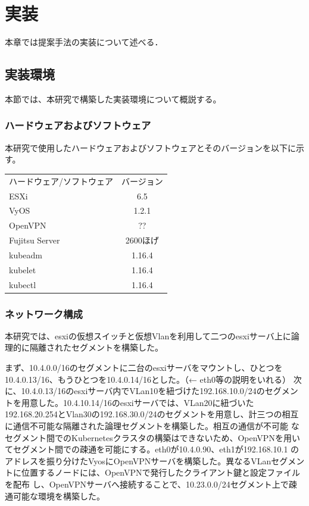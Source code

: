 \chapter{実装}
\label{implementation}

本章では提案手法の実装について述べる．

\section{実装環境}
\label{implementation:environment}
本節では、本研究で構築した実装環境について概説する。

\subsection{ハードウェアおよびソフトウェア}
\label{implementation:environment:resouces}
本研究で使用したハードウェアおよびソフトウェアとそのバージョンを以下に示す。

\begin{table}[htb]
  \begin{tabular}{lc}
    ハードウェア/ソフトウェア & バージョン \\
    ESXi & 6.5 \\
    VyOS & 1.2.1 \\
    OpenVPN & ?? \\
    Fujitsu Server & 2600ほげ \\
    kubeadm & 1.16.4 \\
    kubelet & 1.16.4 \\
    kubectl & 1.16.4 \\
  \end{tabular}
\end{table}

\subsection{ネットワーク構成}
\label{implementation:environment:network}
本研究では、esxiの仮想スイッチと仮想Vlanを利用して二つのesxiサーバ上に論理的に隔離されたセグメントを構築した。

まず、10.4.0.0/16のセグメントに二台のesxiサーバをマウントし、ひとつを10.4.0.13/16、もうひとつを10.4.0.14/16とした。（← eth0等の説明をいれる）
次に、10.4.0.13/16のesxiサーバ内でVLan10を紐づけた192.168.10.0/24のセグメントを用意した。10.4.10.14/16のesxiサーバでは、VLan20に紐づいた
192.168.20.254とVlan30の192.168.30.0/24のセグメントを用意し、計三つの相互に通信不可能な隔離された論理セグメントを構築した。相互の通信が不可能
なセグメント間でのKubernetesクラスタの構築はできないため、OpenVPNを用いてセグメント間での疎通を可能にする。eth0が10.4.0.90、eth1が192.168.10.1
のアドレスを振り分けたVyosにOpenVPNサーバを構築した。異なるVLanセグメントに位置するノードには、OpenVPNで発行したクライアント鍵と設定ファイルを配布
し、OpenVPNサーバへ接続することで、10.23.0.0/24セグメント上で疎通可能な環境を構築した。

